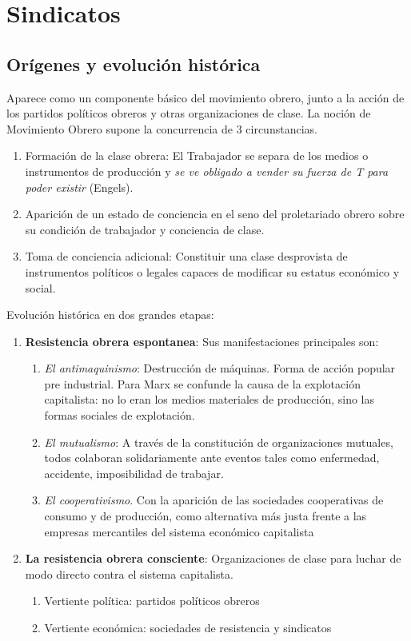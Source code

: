 \documentclass[spanish,12pt,a4paper,titlepage]{report}
\begin{document}
\chapter{Sindicatos}

\section{Orígenes y evolución histórica}
Aparece como un componente básico del movimiento obrero, junto a la acción de los partidos políticos obreros y otras organizaciones de clase. La noción de Movimiento Obrero supone la concurrencia de 3 circunstancias.

\begin{enumerate}
\item Formación de la clase obrera: El Trabajador se separa de los medios o instrumentos de producción y \textit{se ve obligado a vender su fuerza de T para poder existir} (Engels). 
\item Aparición de un estado de conciencia en el seno del proletariado obrero sobre su condición de trabajador y conciencia de clase. 
\item Toma de conciencia adicional: Constituir una clase desprovista de instrumentos políticos o legales capaces de modificar su estatus económico y social. 
\end{enumerate}


Evolución histórica en dos grandes etapas:

\begin{enumerate}
\item \textbf{Resistencia obrera espontanea}: Sus manifestaciones principales son:
	\begin{enumerate}
	\item \textit{El antimaquinismo}: Destrucción de máquinas. Forma de acción popular pre industrial.  Para Marx se confunde la causa de la explotación capitalista: no lo eran los medios materiales de producción, sino las formas sociales de explotación.
	\item \textit{El mutualismo}: A través de la constitución de organizaciones mutuales, todos colaboran solidariamente ante eventos tales como enfermedad, accidente, imposibilidad de trabajar. 
	\item \textit{El cooperativismo}. Con la aparición de las sociedades cooperativas de consumo y de producción, como alternativa más justa frente a las empresas mercantiles del sistema económico capitalista
	\end{enumerate}
	
\item \textbf{La resistencia obrera consciente}: Organizaciones de clase para luchar de modo directo contra el sistema capitalista.
	\begin{enumerate}
	\item Vertiente política: partidos políticos obreros
	\item Vertiente económica: sociedades de resistencia y sindicatos
	\end{enumerate}
\end{enumerate}
\end{document}
